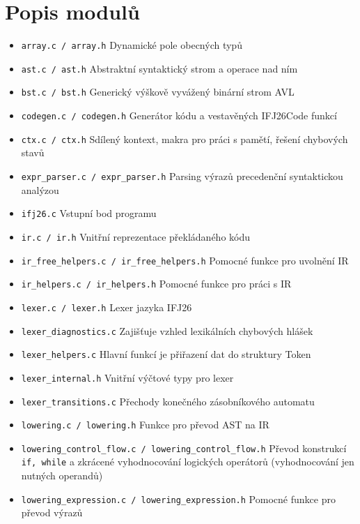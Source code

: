 \documentclass[11pt,a4paper]{article}
\begin{document}
\section{Popis modulů}

\begin{itemize}
    \item \texttt{array.c\,/\,array.h} Dynamické pole obecných typů
    \item \texttt{ast.c\,/\,ast.h} Abstraktní syntaktický strom a operace nad ním
    \item \texttt{bst.c\,/\,bst.h} Generický výškově vyvážený binární strom AVL
    \item \texttt{codegen.c\,/\,codegen.h} Generátor kódu a vestavěných IFJ26Code funkcí
    \item \texttt{ctx.c\,/\,ctx.h} Sdílený kontext, makra pro práci s pamětí, řešení chybových stavů
    \item \texttt{expr\_parser.c\,/\,expr\_parser.h} Parsing výrazů precedenční syntaktickou analýzou
    \item \texttt{ifj26.c} Vstupní bod programu
    \item \texttt{ir.c\,/\,ir.h} Vnitřní reprezentace překládaného kódu
    \item \texttt{ir\_free\_helpers.c\,/\,ir\_free\_helpers.h} Pomocné funkce pro uvolnění IR
    \item \texttt{ir\_helpers.c\,/\,ir\_helpers.h} Pomocné funkce pro práci s IR
    \item \texttt{lexer.c\,/\,lexer.h} Lexer jazyka IFJ26
    \item \texttt{lexer\_diagnostics.c} Zajišťuje vzhled lexikálních chybových hlášek
    \item \texttt{lexer\_helpers.c} Hlavní funkcí je přiřazení dat do struktury Token
    \item \texttt{lexer\_internal.h} Vnitřní výčtové typy pro lexer
    \item \texttt{lexer\_transitions.c} Přechody konečného zásobníkového automatu
    \item \texttt{lowering.c\,/\,lowering.h} Funkce pro převod AST na IR
    \item \texttt{lowering\_control\_flow.c\,/\,lowering\_control\_flow.h} Převod konstrukcí \verb|if, while| a zkrácené vyhodnocování logických operátorů (vyhodnocování jen nutných operandů)
    \item \texttt{lowering\_expression.c\,/\,lowering\_expression.h} Pomocné funkce pro převod výrazů

\end{itemize}
\end{document}

